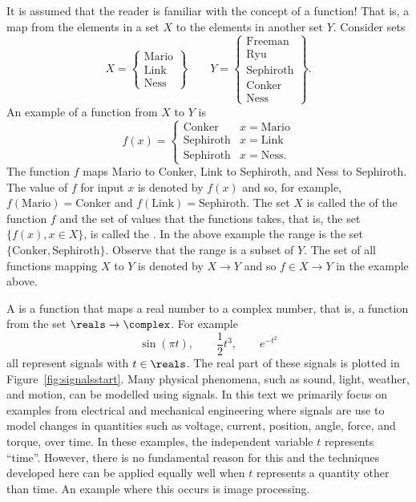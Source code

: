

It is assumed that the reader is familiar with the concept of a function!  That is, a map from the elements in a set $X$ to the elements in another set $Y$.  Consider sets
\[
X = \left\{
\begin{array}{c}
\text{Mario} \\
\text{Link} \\
\text{Ness} 
\end{array} 
\right\}
 \qquad 
Y = \left\{
\begin{array}{c}
\text{Freeman} \\
\text{Ryu} \\
\text{Sephiroth} \\
\text{Conker} \\
\text{Ness}
\end{array} 
\right\}.
\]
An example of a function from $X$ to $Y$ is
\[
f(x) = \begin{cases}
\text{Conker} & x = \text{Mario} \\
\text{Sephiroth} & x = \text{Link} \\
\text{Sephiroth} & x = \text{Ness}.
\end{cases}
\]
The function $f$ maps Mario to Conker, Link to Sephiroth, and Ness to Sephiroth.  The value of $f$ for input $x$ is denoted by $f(x)$ and so, for example, $f(\text{Mario}) = \text{Conker}$ and $f(\text{Link}) = \text{Sephiroth}$.  The set $X$ is called the  of the function $f$ and the set of values that the functions takes, that is, the set $\{f(x), x \in X\}$, is called the .  In the above example the range is the set $\{\text{Conker}, \text{Sephiroth}\}$.  Observe that the range is a subset of $Y$.  The set of all functions mapping $X$ to $Y$ is denoted by $X \to Y$ and so $f \in X \to Y$ in the example above.

A  is a function that maps a real number to a complex number, that is, a function from the set $\reals \to \complex$.  For example
\[
\sin( \pi t), \qquad \frac{1}{2} t^3, \qquad e^{-t^2}
\]   
all represent signals with $t \in \reals$.  The real part of these signals is plotted in Figure~\ref{fig:signalsstart}.  Many physical phenomena, such as sound, light, weather, and motion, can be modelled using signals.  In this text we primarily focus on examples from electrical and mechanical engineering where signals are use to model changes in quantities such as voltage, current, position, angle, force, and torque, over time.  In these examples, the independent variable $t$ represents ``time''.  However, there is no fundamental reason for this and the techniques developed here can be applied equally well when $t$ represents a quantity other than time.  An example where this occurs is image processing.

